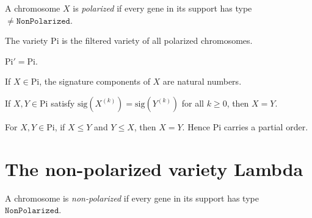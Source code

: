 \begin{definition}
  \label{def:IsPolarized}
  \leanok
  A chromosome $X$ is \emph{polarized} if every gene in its support has type
  $\ne \mathtt{NonPolarized}$.
\end{definition}

\begin{definition}[Variety Pi]
  \label{def:Variety.Pi}
  \leanok
  The variety $\mathrm{Pi}$ is the filtered variety of all polarized chromosomes.
\end{definition}

\begin{lemma}
  \label{lem:prime_Pi}
  \leanok
  $\mathrm{Pi}' = \mathrm{Pi}$.
\end{lemma}

\begin{lemma}
  \label{lem:signature_pi_isNat}
  \leanok
  If $X \in \mathrm{Pi}$, the signature components of $X$ are natural numbers.
\end{lemma}

\begin{lemma}
  \label{lem:eq_of_sigma_eq}
  \leanok
  If $X, Y \in \mathrm{Pi}$ satisfy $\mathrm{sig}(X^{(k)}) = \mathrm{sig}(Y^{(k)})$ for all $k \ge 0$,
  then $X = Y$.
\end{lemma}

\begin{lemma}
  \label{lem:pi_chromosome_antisymm}
  \leanok
  For $X, Y \in \mathrm{Pi}$, if $X \le Y$ and $Y \le X$, then $X = Y$.
  Hence $\mathrm{Pi}$ carries a partial order.
\end{lemma}

\section{The non-polarized variety Lambda}

\begin{definition}
  \label{def:IsNonPolarized}
  \leanok
  A chromosome is \emph{non-polarized} if every gene in its support has type
  $\mathtt{NonPolarized}$.
\end{definition}

